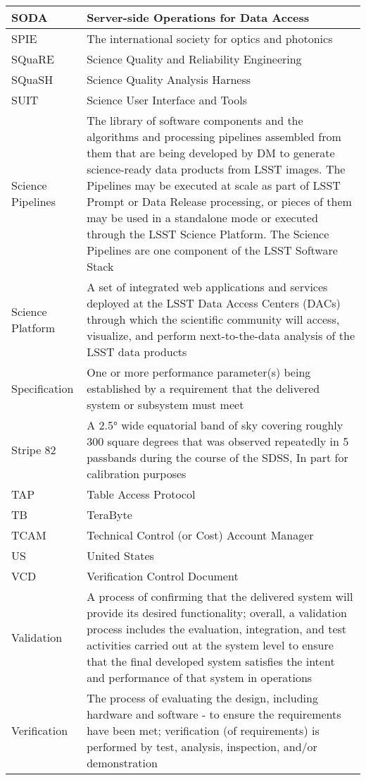 \begin{longtable}{|p{}|p{}|}
SODA & Server-side Operations for Data Access \\\hline
SPIE & The international society for optics and photonics \\\hline
SQuaRE & Science Quality and Reliability Engineering \\\hline
SQuaSH & Science Quality Analysis Harness \\\hline
SUIT & Science User Interface and Tools \\\hline
Science Pipelines & The library of software components and the algorithms and processing pipelines assembled from them that are being developed by DM to generate science-ready data products from LSST images. The Pipelines may be executed at scale as part of LSST Prompt or Data Release processing, or pieces of them may be used in a standalone mode or executed through the LSST Science Platform. The Science Pipelines are one component of the LSST Software Stack \\\hline
Science Platform & A set of integrated web applications and services deployed at the LSST Data Access Centers (DACs) through which the scientific community will access, visualize, and perform next-to-the-data analysis of the LSST data products \\\hline
Specification & One or more performance parameter(s) being established by a requirement that the delivered system or subsystem must meet \\\hline
Stripe 82 & A 2.5° wide equatorial band of sky covering roughly 300 square degrees that was observed repeatedly in 5 passbands during the course of the SDSS, In part for calibration purposes \\\hline
TAP & Table Access Protocol \\\hline
TB & TeraByte \\\hline
TCAM & Technical Control (or Cost) Account Manager \\\hline
US & United States \\\hline
VCD & Verification Control Document \\\hline
Validation & A process of confirming that the delivered system will provide its desired functionality; overall, a validation process includes the evaluation, integration, and test activities carried out at the system level to ensure that the final developed system satisfies the intent and performance of that system in operations \\\hline
Verification & The process of evaluating the design, including hardware and software - to ensure the requirements have been met;  verification (of requirements) is performed by test, analysis, inspection, and/or demonstration \\\hline

\end{longtable}
